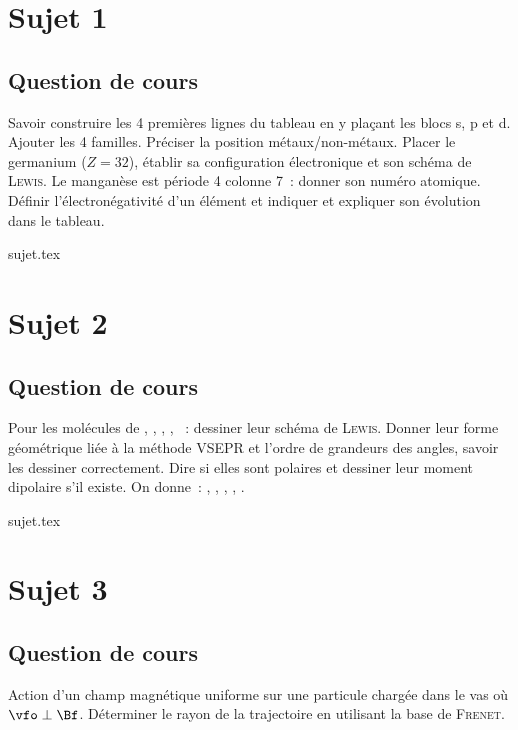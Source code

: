 \documentclass[a4paper, 11pt]{book}
\begin{document}
\chapter{Sujet 1}
\section{Question de cours}

Savoir construire les 4 premières lignes du tableau en y plaçant les blocs s, p
et d. Ajouter les 4 familles. Préciser la position métaux/non-métaux. Placer le
germanium ($Z=32$), établir sa configuration électronique et son schéma de
\textsc{Lewis}. Le manganèse  est période 4 colonne 7~: donner son
numéro atomique. Définir l'électronégativité d'un élément et indiquer et
expliquer son évolution dans le tableau.

\resetQ
{sujet.tex}

\chapter{Sujet 2}
\section{Question de cours}

Pour les molécules de , , , , ~:
dessiner leur schéma de \textsc{Lewis}. Donner leur forme géométrique liée à la
méthode VSEPR et l'ordre de grandeurs des angles, savoir les dessiner
correctement. Dire si elles sont polaires et dessiner leur moment dipolaire s'il
existe. On donne~: , , , , .

\resetQ
{sujet.tex}

\chapter{Sujet 3}
\section{Question de cours}

Action d'un champ magnétique uniforme sur une particule chargée dans le vas où
$\vfo\perp\Bf$. Déterminer le rayon de la trajectoire en utilisant la base de
\textsc{Frenet}.
\end{document}
